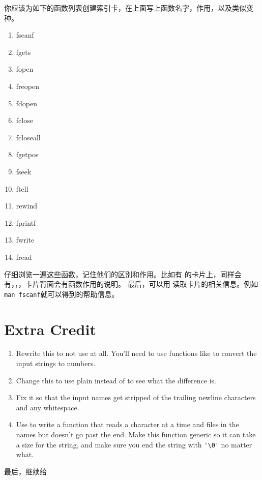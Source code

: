 你应该为如下的函数列表创建索引卡，在上面写上函数名字，作用，以及类似变种。

\begin{enumerate}
\item fscanf
\item fgets
\item fopen
\item freopen
\item fdopen
\item fclose
\item fcloseall
\item fgetpos
\item fseek
\item ftell
\item rewind
\item fprintf
\item fwrite
\item fread
\end{enumerate}

仔细浏览一遍这些函数，记住他们的区别和作用。比如有 的卡片上，同样会有，，，卡片背面会有函数作用的说明。
最后，可以用  读取卡片的相关信息。例如\verb|man fscanf|就可以得到的帮助信息。 

\section{Extra Credit}

\begin{enumerate}
\item Rewrite this to not use  at all.  You'll need to use
    functions like  to convert the input strings to numbers.
\item Change this to use plain  instead of  to
    see what the difference is.
\item Fix it so that the input names get stripped of the trailing newline
    characters and any whitespace.
\item Use  to write a function that reads a character at a time
    and files in the names but doesn't go past the end.  Make this function
    generic so it can take a size for the string, and make sure you end
    the string with \verb|'\0'| no matter what.
\end{enumerate}

最后，继续给
